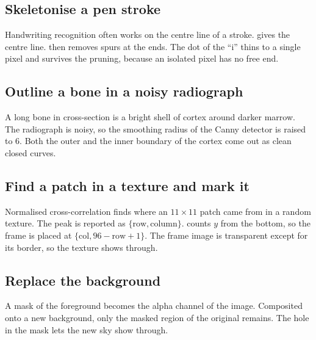 
\subsection*{Skeletonise a pen stroke}

Handwriting recognition often works on the centre line of a stroke.  gives the centre line.  then removes
spurs at the ends. The dot of the ``i'' thins to a single pixel and survives the
pruning, because an isolated pixel has no free end.


\subsection*{Outline a bone in a noisy radiograph}

A long bone in cross-section is a bright shell of cortex around darker marrow. The
radiograph is noisy, so the smoothing radius of the Canny detector is raised to
\(6\). Both the outer and the inner boundary of the cortex come out as clean
closed curves.


\subsection*{Find a patch in a texture and mark it}

Normalised cross-correlation finds where an \(11\times11\) patch came from in a
random texture. The peak is reported as \(\{\text{row}, \text{column}\}\).
 counts \(y\) from the bottom, so the frame is placed at
\(\{\text{col}, 96 - \text{row} + 1\}\). The frame image is transparent except
for its border, so the texture shows through.


\subsection*{Replace the background}

A mask of the foreground becomes the alpha channel of the image. Composited onto a
new background, only the masked region of the original remains. The hole in the
mask lets the new sky show through.

